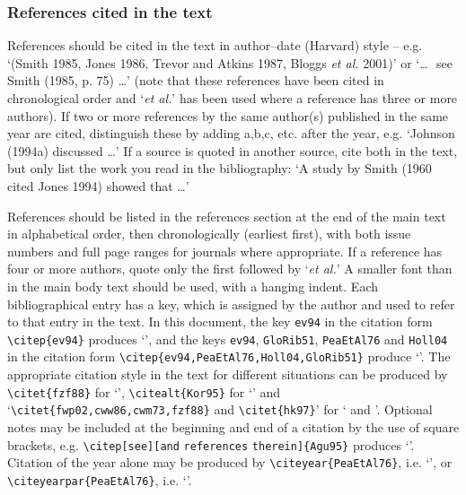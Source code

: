 \documentclass[]{cJEN2e}
\begin{document}
\subsubsection{References cited in the text} References should be cited in the text in  author--date (Harvard) style -- e.g. `(Smith 1985, Jones 1986, Trevor and Atkins 1987, Bloggs {\itshape{et al.}} 2001)' or `\ldots\,\, see Smith (1985, p. 75) \ldots' (note that these references have been cited in chronological order and `{\itshape{et al.}}' has been used where a reference has three or more authors). If two or more references by the same author(s) published in the same year are cited, distinguish these by adding a,b,c, etc. after the year, e.g. `Johnson (1994a) discussed \ldots' If a source is quoted in another source, cite both in the text, but only list the work you read in the bibliography: `A study by Smith (1960 cited Jones 1994) showed that \ldots'

References should be listed in the references section at the end of the main text in alphabetical order, then chronologically (earliest first), with both issue numbers and full page ranges for journals where appropriate. If a reference has four or more authors, quote only the first followed  by `{\itshape{et al.}}' A smaller font than in the main body text should be used, with a hanging indent. Each bibliographical entry has a key, which is assigned by the author and used to refer to that entry in the text. In this document, the key \verb"ev94" in the citation form \verb"\citep{ev94}" produces `\citep{ev94}', and the keys \verb"ev94", \verb"GloRib51", \verb"PeaEtAl76" and \verb"Holl04" in the citation form \verb"\citep{ev94,PeaEtAl76,Holl04,GloRib51}" produce `\citep{ev94,PeaEtAl76,Holl04,GloRib51}'. The appropriate citation style in the text for different situations can be produced by \verb"\citet{fzf88}" for `\citet{fzf88}', \verb"\citealt{Kor95}" for `\citealt{Kor95}' and `\verb"\citet{fwp02,cww86,cwm73,fzf88}" and \verb"\citet{hk97}"' for `\citet{fwp02,cww86,cwm73,fzf88} and \citet{hk97}'. Optional notes may be included at the beginning and end of a citation by the use of square brackets, e.g. \verb"\citep[see][and" \verb"references" \verb"therein]{Agu95}" produces `\citep[see][and references therein]{Agu95}'. Citation of the year alone may be produced by \verb"\citeyear{PeaEtAl76}", i.e. `\citeyear{PeaEtAl76}', or \verb"\citeyearpar{PeaEtAl76}", i.e. `\citeyearpar{PeaEtAl76}'.
\end{document}
